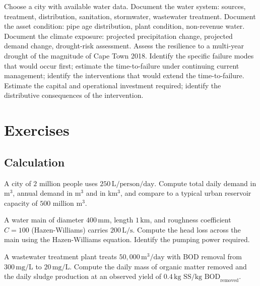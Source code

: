 \begin{project}
Choose a city with available water data. Document the water system: sources, treatment, distribution, sanitation, stormwater, wastewater treatment. Document the asset condition: pipe age distribution, plant condition, non-revenue water. Document the climate exposure: projected precipitation change, projected demand change, drought-risk assessment. Assess the resilience to a multi-year drought of the magnitude of Cape Town 2018. Identify the specific failure modes that would occur first; estimate the time-to-failure under continuing current management; identify the interventions that would extend the time-to-failure. Estimate the capital and operational investment required; identify the distributive consequences of the intervention.
\end{project}

\section{Exercises}

\subsection*{Calculation}

\begin{exercise}
A city of $2$ million people uses $250\,\text{L/person/day}$. Compute total daily demand in m$^3$, annual demand in m$^3$ and in km$^3$, and compare to a typical urban reservoir capacity of $500$ million m$^3$.
\end{exercise}

\begin{exercise}
A water main of diameter $400\,\text{mm}$, length $1\,\text{km}$, and roughness coefficient $C = 100$ (Hazen-Williams) carries $200\,\text{L/s}$. Compute the head loss across the main using the Hazen-Williams equation. Identify the pumping power required.
\end{exercise}

\begin{exercise}
A wastewater treatment plant treats $50{,}000\,\text{m}^3/\text{day}$ with BOD removal from $300\,\text{mg/L}$ to $20\,\text{mg/L}$. Compute the daily mass of organic matter removed and the daily sludge production at an observed yield of $0.4\,\text{kg SS}/\text{kg BOD}_{\text{removed}}$.
\end{exercise}

